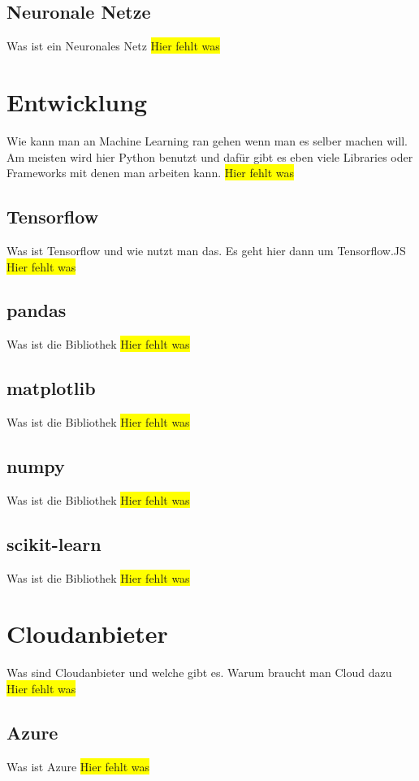 \subsection{Neuronale Netze}
Was ist ein Neuronales Netz
\colorbox{yellow}{Hier fehlt was}

\section{Entwicklung}
Wie kann man an Machine Learning ran gehen wenn man es selber machen will.
Am meisten wird hier Python benutzt und dafür gibt es eben viele Libraries oder Frameworks mit denen man arbeiten kann.
\colorbox{yellow}{Hier fehlt was}

\subsection{Tensorflow}
Was ist Tensorflow und wie nutzt man das. Es geht hier dann um Tensorflow.JS
\colorbox{yellow}{Hier fehlt was}

\subsection{pandas}
Was ist die Bibliothek
\colorbox{yellow}{Hier fehlt was}

\subsection{matplotlib}
Was ist die Bibliothek
\colorbox{yellow}{Hier fehlt was}

\subsection{numpy}
Was ist die Bibliothek
\colorbox{yellow}{Hier fehlt was}

\subsection{scikit-learn}
Was ist die Bibliothek
\colorbox{yellow}{Hier fehlt was}

\section{Cloudanbieter}
Was sind Cloudanbieter und welche gibt es. Warum braucht man Cloud dazu
\colorbox{yellow}{Hier fehlt was}

\subsection{Azure}
Was ist Azure
\colorbox{yellow}{Hier fehlt was}

